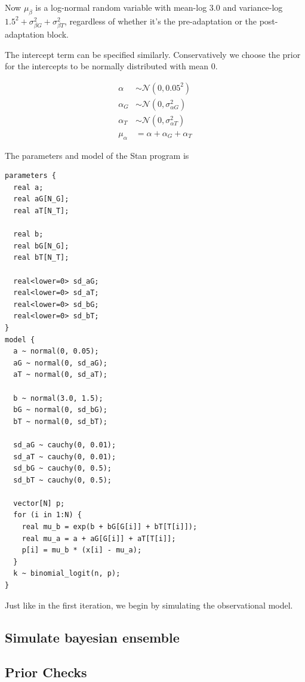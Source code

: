 \documentclass[11pt, oneside, openany]{scrbook}
\begin{document}
Now \(\mu_\beta\) is a log-normal random variable with mean-log \(3.0\) and variance-log \(1.5^2 + \sigma_{\beta G}^2 + \sigma_{\beta T}^2\), regardless of whether it's the pre-adaptation or the post-adaptation block.

The intercept term can be specified similarly. Conservatively we choose the prior for the intercepts to be normally distributed with mean 0.

\begin{align*}
\alpha &\sim \mathcal{N}(0, 0.05^2) \\
\alpha_G &\sim \mathcal{N}(0, \sigma_{\alpha G}^2) \\
\alpha_T &\sim \mathcal{N}(0, \sigma_{\alpha T}^2) \\
\mu_\alpha &= \alpha + \alpha_{G} + \alpha_{T}
\end{align*}

The parameters and model of the Stan program is

\begin{verbatim}
parameters {
  real a;
  real aG[N_G];
  real aT[N_T];
  
  real b;
  real bG[N_G];
  real bT[N_T];
  
  real<lower=0> sd_aG;
  real<lower=0> sd_aT;
  real<lower=0> sd_bG;
  real<lower=0> sd_bT;
}
model {
  a ~ normal(0, 0.05);
  aG ~ normal(0, sd_aG);
  aT ~ normal(0, sd_aT);
  
  b ~ normal(3.0, 1.5);
  bG ~ normal(0, sd_bG);
  bT ~ normal(0, sd_bT);
  
  sd_aG ~ cauchy(0, 0.01);
  sd_aT ~ cauchy(0, 0.01);
  sd_bG ~ cauchy(0, 0.5);
  sd_bT ~ cauchy(0, 0.5);
  
  vector[N] p;
  for (i in 1:N) {
    real mu_b = exp(b + bG[G[i]] + bT[T[i]]);
    real mu_a = a + aG[G[i]] + aT[T[i]];
    p[i] = mu_b * (x[i] - mu_a);
  }
  k ~ binomial_logit(n, p);
}
\end{verbatim}

Just like in the first iteration, we begin by simulating the observational model.

\hypertarget{simulate-bayesian-ensemble}{%
\subsection{Simulate bayesian ensemble}\label{simulate-bayesian-ensemble}}

\hypertarget{prior-checks}{%
\subsection{Prior Checks}\label{prior-checks}}
\end{document}

